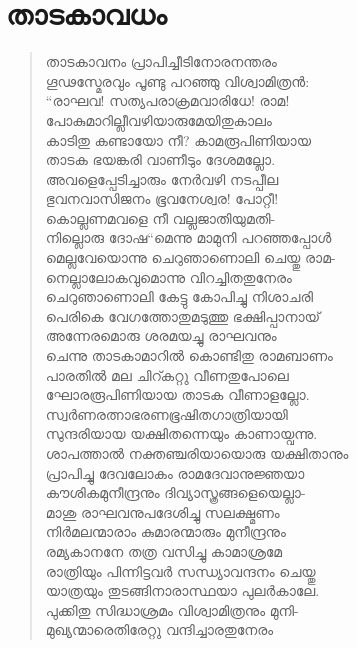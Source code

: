 
\section{താടകാവധം}

\begin{verse}
താടകാവനം പ്രാപിച്ചീടിനോരനന്തരം\\
ഗൂഢസ്മേരവും പൂണ്ടു പറഞ്ഞു വിശ്വാമിത്രന്‍:\\
“രാഘവ! സത്യപരാക്രമവാരിധേ! രാമ!\\
പോകുമാറില്ലീവഴിയാരുമേയിതുകാലം\\
കാടിതു കണ്ടായോ നീ? കാമരൂപിണിയായ\\
താടക ഭയങ്കരി വാണീടും ദേശമല്ലോ.\\
അവളെപ്പേടിച്ചാരും നേര്‍വഴി നടപ്പീല\\
ഭുവനവാസിജനം ഭൂവനേശ്വര! പോറ്റീ!\\
കൊല്ലണമവളെ നീ വല്ലജാതിയുമതി-\\
നില്ലൊരു ദോഷ“മെന്നു മാമുനി പറഞ്ഞപ്പോള്‍\\
മെല്ലവേയൊന്നു ചെറുഞാണൊലി ചെയ്തു രാമ-\\
നെല്ലാലോകവുമൊന്നു വിറച്ചിതതുനേരം\\
ചെറുഞാണൊലി കേട്ടു കോപിച്ചു നിശാചരി\\
പെരികെ വേഗത്തോതുമടുത്തു ഭക്ഷിപ്പാനായ്\\
അന്നേരമൊരു ശരമയച്ചു രാഘവനും\\
ചെന്നു താടകാമാറില്‍ കൊണ്ടിതു രാമബാണം\\
പാരതില്‍ മല ചിറ്കറ്റു വീണതുപോലെ\\
ഘോരരൂപിണിയായ താടക വീണാളല്ലോ.\\
സ്വര്‍ണരത്നാഭരണഭൂഷിതഗാത്രിയായി\\
സുന്ദരിയായ യക്ഷിതന്നെയും കാണായ്വന്നു.\\
ശാപത്താല്‍ നക്തഞ്ചരിയായൊരു യക്ഷിതാനും\\
പ്രാപിച്ചു ദേവലോകം രാമദേവാനുജ്ഞയാ\\
കൗശികമുനീന്ദ്രനും ദിവ്യാസ്ത്രങ്ങളെയെല്ലാ-\\
മാശു രാഘവനുപദേശിച്ചു സലക്ഷ്മണം\\
നിര്‍മലന്മാരാം കുമാരന്മാരും മുനീന്ദ്രനും\\
രമ്യകാനനേ തത്ര വസിച്ചു കാമാശ്രമേ\\
രാത്രിയും പിന്നിട്ടവര്‍ സന്ധ്യാവന്ദനം ചെയ്തു\\
യാത്രയും തുടങ്ങിനാരാസ്ഥയാ പുലര്‍കാലേ.\\
പുക്കിതു സിദ്ധാശ്രമം വിശ്വാമിത്രനും മുനി-\\
മുഖ്യന്മാരെതിരേറ്റു വന്ദിച്ചാരതുനേരം\\

\end{verse}
